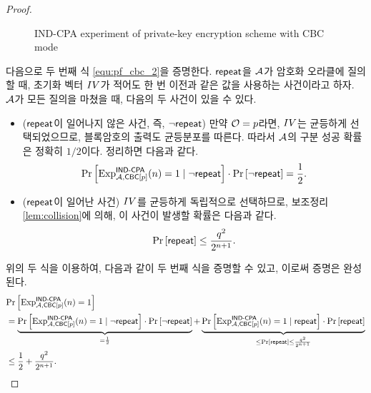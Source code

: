 \begin{proof}
\begin{figure}[ht]
    \caption{\textsf{IND-CPA} experiment of private-key encryption scheme with
      CBC mode}
    \label{fig:exp_ind_cpa_cbc}
  \end{figure}

  다음으로 두 번째 식 \ref{equ:pf_cbc_2}을 증명한다. $\textsf{repeat}$을 $\mathcal{A}$가 암호화 오라클에
  질의할 때, 초기화 벡터 $IV$가 적어도 한 번 이전과 같은 값을 사용하는 사건이라고 하자. $\mathcal{A}$가
  모든 질의을 마쳤을 때, 다음의 두 사건이 있을 수 있다.
  \begin{itemize}
    \item ($\textsf{repeat}$이 일어나지 않은 사건, 즉, $\neg\textsf{repeat}$) 만약 $\mathcal{O} = p$라면,
          $IV$는 균등하게 선택되었으므로, 블록암호의 출력도 균등분포를 따른다. 따라서 $\mathcal{A}$의
          구분 성공 확률은 정확히 $1/2$이다. 정리하면 다음과 같다.
          \begin{equation}
            \text{Pr} \left[ \text{Exp}_{\mathcal{A}, \textsf{CBC}[p]}^{\textsf{IND-CPA}}(n) = 1 \;|\; \neg\textsf{repeat} \right]
            \cdot \text{Pr} \left[ \neg\textsf{repeat} \right] = \frac{1}{2}.
          \end{equation}

    \item ($\textsf{repeat}$이 일어난 사건) $IV$를 균등하게 독립적으로 선택하므로, 보조정리
          \ref{lem:collision}에 의해, 이 사건이 발생할 확률은 다음과 같다.
          \begin{equation}
            \text{Pr} \left[ \textsf{repeat} \right] \le \frac{q^2}{2^{n + 1}}.
          \end{equation}
  \end{itemize}
  위의 두 식을 이용하여, 다음과 같이 두 번째 식을 증명할 수 있고, 이로써 증명은 완성된다.
  \begin{equation}
    \begin{split}
      &\text{Pr} \left[ \text{Exp}_{\mathcal{A}, \textsf{CBC}[p]}^{\textsf{IND-CPA}}(n) = 1 \right] \\
      &= \underbrace{
        \text{Pr} \left[ \text{Exp}_{\mathcal{A}, \textsf{CBC}[p]}^{\textsf{IND-CPA}}(n) = 1 \;|\; \neg\textsf{repeat} \right]
        \cdot \text{Pr} \left[ \neg\textsf{repeat} \right]
      }_{= \frac{1}{2}}
      + \underbrace{
        \text{Pr} \left[ \text{Exp}_{\mathcal{A}, \textsf{CBC}[p]}^{\textsf{IND-CPA}}(n) = 1 \;|\; \textsf{repeat} \right]
        \cdot \text{Pr} \left[ \textsf{repeat} \right]
      }_{\le \text{Pr} \left[ \textsf{repeat} \right] \le \frac{q^2}{2^{n + 1}}} \\
      &\le \frac{1}{2} + \frac{q^2}{2^{n + 1}}.
    \end{split}
  \end{equation}
\end{proof}


